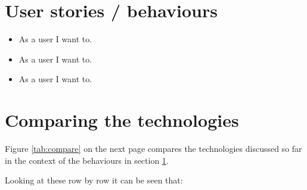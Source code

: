 \section{User stories / behaviours}
\label{behaviours}

\begin{itemize}
\item As a user I want to.
\item As a user I want to.
\item As a user I want to.
\end{itemize}

\section{Comparing the technologies}
Figure \ref{tab:compare} on the next page compares the technologies discussed so far in the context of the behaviours in section \ref{behaviours}. \par
Looking at these row by row it can be seen that:\par\
